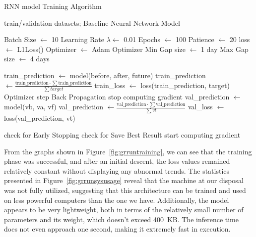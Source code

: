 \begin{algorithm}[H]
	\caption{RNN model Training Algorithm}\label{alg:grruntraining}
	\begin{algorithmic}
		\Require train/validation datasets; Baseline Neural Network Model

		\State Batch Size $\gets$ 10
		\State Learning Rate $\lambda \gets$ 0.01
		\State Epochs $\gets$ 100
		\State Patience $\gets$ 20
		\State loss $\gets$ L1Loss()
		\State Optimizer $\gets$ Adam Optimizer
		\State Min Gap size $\gets$ 1 day
		\State Max Gap size $\gets$ 4 days
		\State

		\State train\_prediction $\gets$ model(before, after, future) 
		\State train\_prediction $\gets \frac{\text{train\_prediction} \cdot \sum\text{train\_prediction}}{\sum target}$ 
		\State train\_loss $\gets$ loss(train\_prediction, target)
		\State Optimizer step
		\State Back Propagation
		\EndFor
		\State stop computing gradient
		\State val\_prediction $\gets$ model(vb, va, vf) 
		\State val\_prediction $\gets \frac{\text{val\_prediction} \cdot \sum\text{val\_prediction}}{\sum vt}$ 
		\State val\_loss $\gets$ loss(val\_prediction, vt)
		\EndFor

		\State check for Early Stopping
		\State check for Save Best Result
		\State start computing gradient
		\EndFor
	\end{algorithmic}
\end{algorithm}

From the graphs shown in Figure~\ref{fig:grruntraining},
we can see that the training phase was successful,
and after an initial descent, the loss values remained relatively
constant without displaying any abnormal trends.
The statistics presented in Figure~\ref{fig:grrunsysusage} reveal
that the machine at our disposal was not fully utilized,
suggesting that this architecture can be trained and used on
less powerful computers than the one we have.
Additionally, the model appears to be very lightweight, both in terms
of the relatively small number of parameters and its weight,
which doesn't exceed 400~KB. The inference time does not even
approach one second, making it extremely fast in execution.


